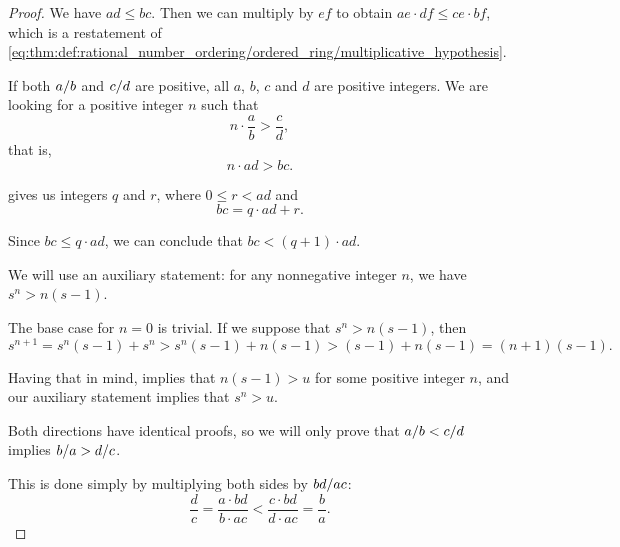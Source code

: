 \begin{proof}
  We have \( ad \leq bc \). Then we can multiply by \( ef \) to obtain \( ae \cdot df \leq ce \cdot bf \), which is a restatement of \eqref{eq:thm:def:rational_number_ordering/ordered_ring/multiplicative_hypothesis}.

   If both \( \ifrac a b \) and \( \ifrac c d \) are positive, all \( a \), \( b \), \( c \) and \( d \) are positive integers. We are looking for a positive integer \( n \) such that
  \begin{equation*}
    n \cdot \frac a b > \frac c d,
  \end{equation*}
  that is,
  \begin{equation*}
    n \cdot ad > bc.
  \end{equation*}

   gives us integers \( q \) and \( r \), where \( 0 \leq r < ad \) and
  \begin{equation*}
    bc = q \cdot ad + r.
  \end{equation*}

  Since \( bc \leq q \cdot ad \), we can conclude that \( bc < (q + 1) \cdot ad \).

   We will use an auxiliary statement: for any nonnegative integer \( n \), we have \( s^n > n(s - 1) \).

  The base case for \( n = 0 \) is trivial. If we suppose that \( s^n > n(s - 1) \), then
  \begin{equation*}
    s^{n+1} = s^n(s - 1) + s^n > s^n(s - 1) + n(s - 1) > (s - 1) + n(s - 1) = (n + 1)(s - 1).
  \end{equation*}

  Having that in mind,  implies that \( n(s - 1) > u \) for some positive integer \( n \), and our auxiliary statement implies that \( s^n > u \).

   Both directions have identical proofs, so we will only prove that \( \ifrac a b < \ifrac c d \) implies \( \ifrac b a > \ifrac d c \).

  This is done simply by multiplying both sides by \( \ifrac {bd} {ac} \):
  \begin{equation*}
    \frac d c = \frac {a \cdot bd} {b \cdot ac} < \frac {c \cdot bd} {d \cdot ac} = \frac b a.
  \end{equation*}
\end{proof}

